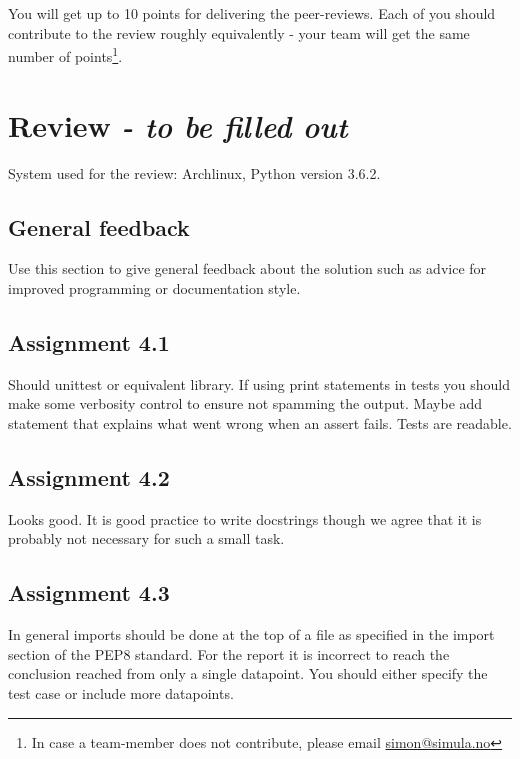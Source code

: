 \documentclass[a4paper]{article}
\begin{document}
You will get up to 10 points for delivering the peer-reviews. Each of you should contribute to the review roughly equivalently - your team will get the same number of points\footnote{In case a team-member does not contribute, please email \href{mailto:simon@simula.no}{simon@simula.no}}. 



\section{Review \emph{- to be filled out}}\label{sec:review}

System used for the review: Archlinux, Python version 3.6.2.

\subsection*{General feedback}
Use this section to give general feedback about the solution such as advice for improved programming or documentation style.

\subsection*{Assignment 4.1}
Should unittest or equivalent library. If using print statements in tests you should make some verbosity control to ensure not spamming the output. Maybe add statement that explains what went wrong when an assert fails. Tests are readable.

\subsection*{Assignment 4.2} \label{sec:assignment5.2}
Looks good. It is good practice to write docstrings though we agree that it is probably not necessary for such a small task.

\subsection*{Assignment 4.3}
In general imports should be done at the top of a file as specified in the import section of the PEP8 standard. 
For the report it is incorrect to reach the conclusion reached from only a single datapoint. You should either specify the test case or include more datapoints.
\end{document}
